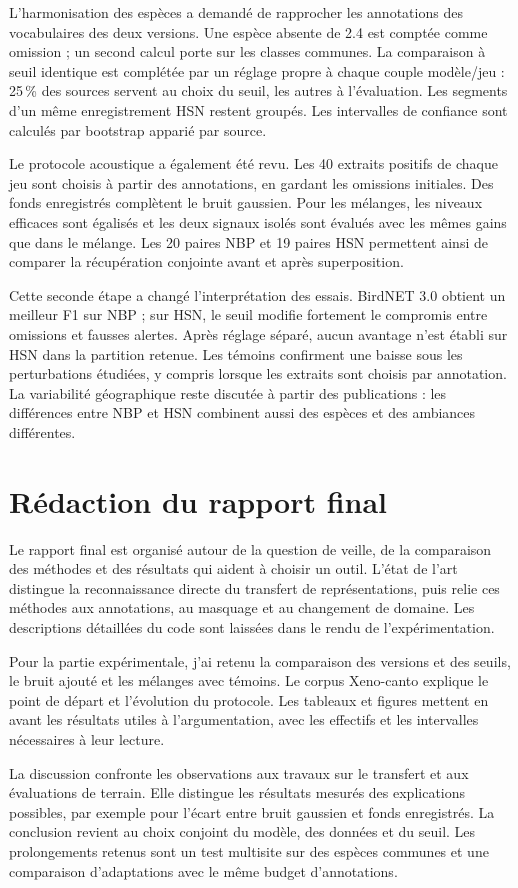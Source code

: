 \documentclass[11pt,a4paper]{article}
\begin{document}
L'harmonisation des espèces a demandé de rapprocher les annotations des
vocabulaires des deux versions. Une espèce absente de 2.4 est comptée comme
omission ; un second calcul porte sur les classes communes. La comparaison
à seuil identique est complétée par un réglage propre à chaque couple
modèle/jeu : 25\,\% des sources servent au choix du seuil, les autres à
l'évaluation. Les segments d'un même enregistrement HSN restent groupés.
Les intervalles de confiance sont calculés par bootstrap apparié par source.

Le protocole acoustique a également été revu. Les 40 extraits positifs de
chaque jeu sont choisis à partir des annotations, en gardant les omissions
initiales. Des fonds enregistrés complètent le bruit gaussien. Pour les
mélanges, les niveaux efficaces sont égalisés et les deux signaux isolés
sont évalués avec les mêmes gains que dans le mélange. Les 20 paires NBP
et 19 paires HSN permettent ainsi de comparer la récupération conjointe
avant et après superposition.

Cette seconde étape a changé l'interprétation des essais. BirdNET 3.0
obtient un meilleur F1 sur NBP ; sur HSN, le seuil modifie fortement le
compromis entre omissions et fausses alertes. Après réglage séparé, aucun
avantage n'est établi sur HSN dans la partition retenue. Les témoins
confirment une baisse sous les perturbations étudiées, y compris lorsque
les extraits sont choisis par annotation. La variabilité géographique
reste discutée à partir des publications : les différences entre NBP
et HSN combinent aussi des espèces et des ambiances différentes.

\section{Rédaction du rapport final}

Le rapport final est organisé autour de la question de veille,
de la comparaison des méthodes et des résultats qui aident à choisir un
outil. L'état de l'art distingue la reconnaissance directe du transfert de
représentations, puis relie ces méthodes aux annotations, au masquage et au
changement de domaine. Les descriptions détaillées du code sont laissées
dans le rendu de l'expérimentation.

Pour la partie expérimentale, j'ai retenu la comparaison des versions et
des seuils, le bruit ajouté et les mélanges avec témoins. Le corpus Xeno-canto
explique le point de départ et l'évolution du protocole. Les tableaux et
figures mettent en avant les résultats utiles à l'argumentation, avec les
effectifs et les intervalles nécessaires à leur lecture.

La discussion confronte les observations aux travaux sur le transfert et
aux évaluations de terrain. Elle distingue les résultats mesurés des
explications possibles, par exemple pour l'écart entre bruit gaussien et
fonds enregistrés. La conclusion revient au choix conjoint du modèle,
des données et du seuil. Les prolongements retenus sont un test multisite
sur des espèces communes et une comparaison d'adaptations avec le même
budget d'annotations.


{\small}
\end{document}
